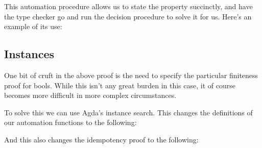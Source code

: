 \begin{minipage}{\linewidth}
  \begin{multicols}{2}
    \begin{agdalisting*}
    \end{agdalisting*} \columnbreak
    \begin{agdalisting*}
    \end{agdalisting*}
  \end{multicols}
\end{minipage}

This automation procedure allows us to state the property succinctly, and have
the type checker go and run the decision procedure to solve it for us.
Here's an example of its use:
\begin{agdalisting*}
\end{agdalisting*}

\subsection{Instances}
One bit of cruft in the above proof is the need to specify the particular
finiteness proof for bools.
While this isn't any great burden in this case, it of course becomes more
difficult in more complex circumstances.

To solve this we can use Agda's instance search.
This changes the definitions of
our automation functions to the following:

\begin{minipage}{\linewidth}
  \begin{multicols}{2}
    \begin{agdalisting*}
    \end{agdalisting*} \columnbreak
    \begin{agdalisting*}
    \end{agdalisting*}
  \end{multicols}
\end{minipage}
And this also changes the idempotency proof to the following:
\begin{agdalisting}
\end{agdalisting}

